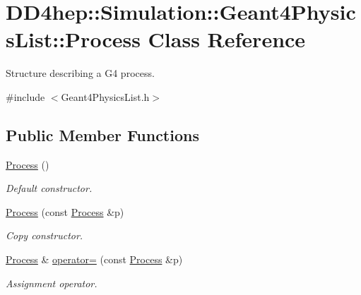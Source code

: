 \hypertarget{class_d_d4hep_1_1_simulation_1_1_geant4_physics_list_1_1_process}{}\section{D\+D4hep\+:\+:Simulation\+:\+:Geant4\+Physics\+List\+:\+:Process Class Reference}
\label{class_d_d4hep_1_1_simulation_1_1_geant4_physics_list_1_1_process}


Structure describing a G4 process.  




{\ttfamily \#include $<$Geant4\+Physics\+List.\+h$>$}

\subsection*{Public Member Functions}
\begin{DoxyCompactItemize}
\item 
\hyperlink{class_d_d4hep_1_1_simulation_1_1_geant4_physics_list_1_1_process_ac8ddef52a1287d02acdb83b769ee8c94}{Process} ()
\begin{DoxyCompactList}\small\item\em Default constructor. \end{DoxyCompactList}\item 
\hyperlink{class_d_d4hep_1_1_simulation_1_1_geant4_physics_list_1_1_process_a8a359fff64fa6b38ca4e8c26f55d82de}{Process} (const \hyperlink{class_d_d4hep_1_1_simulation_1_1_geant4_physics_list_1_1_process}{Process} \&p)
\begin{DoxyCompactList}\small\item\em Copy constructor. \end{DoxyCompactList}\item 
\hyperlink{class_d_d4hep_1_1_simulation_1_1_geant4_physics_list_1_1_process}{Process} \& \hyperlink{class_d_d4hep_1_1_simulation_1_1_geant4_physics_list_1_1_process_a979605cdba461548a4a86b9574ab4e60}{operator=} (const \hyperlink{class_d_d4hep_1_1_simulation_1_1_geant4_physics_list_1_1_process}{Process} \&p)
\begin{DoxyCompactList}\small\item\em Assignment operator. \end{DoxyCompactList}\end{DoxyCompactItemize}

